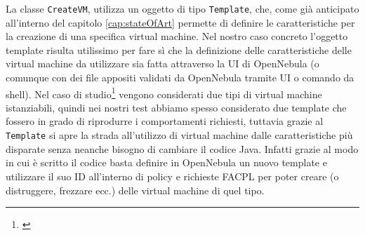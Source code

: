 La classe \texttt{CreateVM}, utilizza un oggetto di tipo \texttt{Template}, che, come già anticipato all'interno del capitolo \ref{cap:stateOfArt} permette di definire le caratteristiche per la creazione di una specifica virtual machine. Nel nostro caso concreto l'oggetto template risulta utilissimo per fare sì che la definizione delle caratteristiche delle virtual machine da utilizzare sia fatta attraverso la UI di OpenNebula (o comunque con dei file appositi validati da OpenNebula tramite UI o comando da shell). Nel caso di studio\footnote{\cite{10.1007/978-3-319-08260-8_6}} vengono considerati due tipi di virtual machine istanziabili, quindi nei nostri test abbiamo spesso considerato due template che fossero in grado di riprodurre i comportamenti richiesti, tuttavia grazie al \texttt{Template} si apre la strada all'utilizzo di virtual machine dalle caratteristiche più disparate senza neanche bisogno di cambiare il codice Java. Infatti grazie al modo in cui è scritto il codice basta definire in OpenNebula un nuovo template e utilizzare il suo ID all'interno di policy e richieste FACPL per poter creare (o distruggere, frezzare ecc.) delle virtual machine di quel tipo.\medbreak

